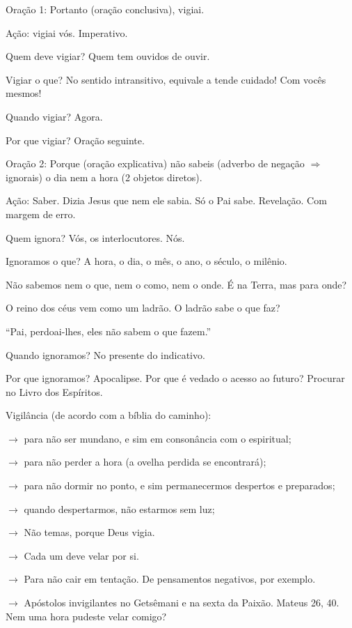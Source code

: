 \documentclass{rbfin}
\begin{document}
\begin{multicols}{2}
Oração 1: Portanto (oração conclusiva), vigiai.

Ação: vigiai vós. Imperativo.

Quem deve vigiar? Quem tem ouvidos de ouvir.

Vigiar o que? No sentido intransitivo, equivale a tende cuidado! Com vocês mesmos!

Quando vigiar? Agora.

Por que vigiar? Oração seguinte.

\dotfill

Oração 2: Porque (oração explicativa) não sabeis (adverbo de negação $\Rightarrow$ ignorais) o dia nem a hora (2 objetos diretos).

Ação: Saber. Dizia Jesus que nem ele sabia. Só o Pai sabe. Revelação. Com margem de erro.

Quem ignora? Vós, os interlocutores. Nós.

Ignoramos o que? A hora, o dia, o mês, o ano, o século, o milênio.

Não sabemos nem o que, nem o como, nem o onde. É na Terra, mas para onde? 

O reino dos céus vem como um ladrão. O ladrão sabe o que faz?

``Pai, perdoai-lhes, eles não sabem o que fazem.'' 

Quando ignoramos? No presente do indicativo.

Por que ignoramos? Apocalipse. Por que é vedado o acesso ao futuro? Procurar no {\color{blue}Livro dos Espíritos}.

\dotfill

\newpage

Vigilância (de acordo com a bíblia do caminho):

$\rightarrow$ para não ser mundano, e sim em consonância com o espiritual;

$\rightarrow$ para não perder a hora (a ovelha perdida se encontrará);

$\rightarrow$ para não dormir no ponto, e sim permanecermos despertos e preparados;

$\rightarrow$ quando despertarmos, não estarmos sem luz;

$\rightarrow$ Não temas, porque Deus vigia.

$\rightarrow$ Cada um deve velar por si.

$\rightarrow$ Para não cair em tentação. De pensamentos negativos, por exemplo.

$\rightarrow$ Apóstolos invigilantes no Getsêmani e na sexta da Paixão. Mateus 26, 40. Nem uma hora pudeste velar comigo?


\end{multicols}
\end{document}
